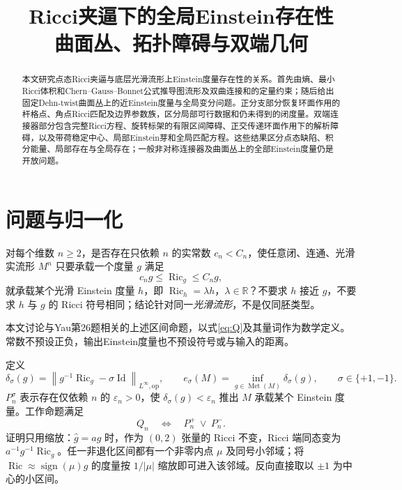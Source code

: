 \documentclass[UTF8,a4paper,11pt,fontset=fandol]{ctexart}
\title{Ricci夹逼下的全局Einstein存在性\\[0.5em]{\large 曲面丛、拓扑障碍与双端几何}}
\author{}
\date{}
\numberwithin{equation}{section}
\theoremstyle{definition}
\newcommand{\Ric}{\operatorname{Ric}}
\newcommand{\Met}{\operatorname{Met}}
\newcommand{\Id}{\operatorname{Id}}
\newcommand{\op}{\mathrm{op}}
\newcommand{\R}{\mathbb R}
\newcommand{\norm}[1]{\left\lVert#1\right\rVert}
\begin{document}
\maketitle
\begin{abstract}
本文研究点态Ricci夹逼与底层光滑流形上Einstein度量存在性的关系。首先由熵、最小Ricci体积和Chern--Gauss--Bonnet公式推导图流形及双曲连接和的定量约束；随后给出固定Dehn-twist曲面丛上的近Einstein度量与全局变分问题。正分支部分恢复环面作用的杆格点、角点Ricci匹配及边界参数族，区分局部可行数据和仍未得到的闭度量。双端连接器部分包含完整Ricci方程、旋转标架的有限区间障碍、正交传递环面作用下的解析障碍，以及带荷稳定中心、局部Einstein芽和全局匹配方程。这些结果区分点态缺陷、积分能量、局部存在与全局存在；一般非对称连接器及曲面丛上的全部Einstein度量仍是开放问题。
\end{abstract}
\begingroup
\small\linespread{1.0}\selectfont\setlength{\parskip}{0pt}
\tableofcontents
\endgroup
\clearpage

\section{问题与归一化}
对每个维数 $n\ge2$，是否存在只依赖 $n$ 的实常数 $c_n<C_n$，使任意闭、连通、光滑实流形 $M^n$ 只要承载一个度量 $g$ 满足
\begin{equation}\label{eq:Q}
 c_ng\le\Ric_g\le C_ng,
\end{equation}
就承载某个光滑 Einstein 度量 $h$，即 $\Ric_h=\lambda h$，$\lambda\in\R$？不要求 $h$ 接近 $g$，不要求 $h$ 与 $g$ 的 Ricci 符号相同；结论针对同一\emph{光滑流形}，不是仅同胚类型。

本文讨论与Yau第26题\cite{Yau1982}相关的上述区间命题，以式\eqref{eq:Q}及其量词作为数学定义。常数不预设正负，输出Einstein度量也不预设符号或与输入的距离。

定义
\begin{equation}\label{eq:defect}
 \delta_\sigma(g)=\norm{g^{-1}\Ric_g-\sigma\Id}_{L^\infty,\op},\qquad
 e_\sigma(M)=\inf_{g\in\Met(M)}\delta_\sigma(g),\qquad \sigma\in\{+1,-1\}.
\end{equation}
$P_n^\sigma$ 表示存在仅依赖 $n$ 的 $\varepsilon_n>0$，使 $\delta_\sigma(g)<\varepsilon_n$ 推出 $M$ 承载某个 Einstein 度量。工作命题满足
\begin{equation}\label{eq:branches}
 Q_n\quad\Longleftrightarrow\quad P_n^+\ \lor\ P_n^-.
\end{equation}
证明只用缩放：$\widehat g=ag$ 时，作为 $(0,2)$ 张量的 Ricci 不变，Ricci 端同态变为 $a^{-1}g^{-1}\Ric_g$。任一非退化区间都有一个非零内点 $\mu$ 及同号小邻域；将 $\Ric\approx\operatorname{sign}(\mu)g$ 的度量按 $1/|\mu|$ 缩放即可进入该邻域。反向直接取以 $\pm1$ 为中心的小区间。
\end{document}
